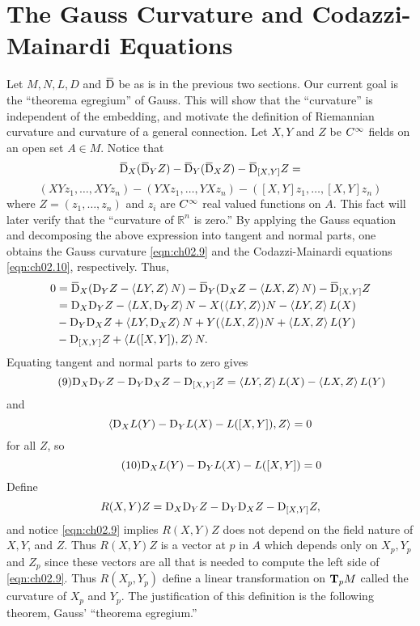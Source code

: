 \documentclass[../main]{subfiles}
\begin{document}
\section{The Gauss Curvature and Codazzi-Mainardi Equations}\label{ch02:s4}
Let $M,N,L,D$ and $\covariant$ be as is in the previous two sections. Our current goal is the ``theorema egregium'' of Gauss. This will show that the ``curvature'' is independent of the embedding, and motivate the definition of Riemannian curvature and curvature of a general connection.
Let $X,Y$ and $Z$ be $\CInfty$ fields on an open set $A \in M$. Notice that
\[\covariant_{X}(\covariant_{Y}Z)-\covariant_{Y}(\covariant_{X}Z)-\covariant_{[X,Y]}Z=\]
\[(XYz_1,\dots,XYz_n)-(YXz_1,\dots,YXz_n)-([X,Y]z_1,\dots,[X,Y]z_n)\]
where $Z=(z_1,\dots,z_n)$ and $z_i$ are $\CInfty$ real valued functions on $A$. This fact will later verify that the ``curvature of $\mathbb{R}^n$ is zero.'' By applying the Gauss equation and decomposing the above expression into tangent and normal parts, one obtains the Gauss curvature \ref{eqn:ch02.9} and the Codazzi-Mainardi equations \ref{eqn:ch02.10}, respectively.
Thus,  
\begin{align*}
0 &=\covariant_{X}(\connection_{Y} Z-\ip{L Y}{Z}N)-\covariant_{Y}(\connection_{X} Z-\ip{LX}{Z}N)-\covariant_{[X, Y]} Z\\
&=\connection_{X} \connection_{Y} Z-\ip{L X}{\connection_{Y} Z}N-X(\ip{LY}{Z}) N-\ip{L Y}{Z}L(X)\\
&-\connection_{Y} \connection_{X} Z+\ip{L Y}{\connection_{X} Z}N+Y(\ip{L X}{Z}) N+\ip{L X}{ Z}L(Y)\\
&-\connection_{[X, Y]} Z+\ip{ L([X, Y])}{ Z}N .
\end{align*}
Equating tangent and normal parts to zero gives
\begin{equation}\tag{9}\label{eqn:ch02.9}
    \connection_{X} \connection_{Y} Z-\connection_{Y} \connection_{X} Z-\connection_{[X, Y]} Z=\ip{LY}{Z}L(X)-\ip{LX}{Z}L(Y)
\end{equation}
and
\[
\ip{\connection_XL(Y)-\connection_YL(X)-L([X,Y])}{Z} = 0
\]
for all $Z$, so
\begin{equation}\tag{10}\label{eqn:ch02.10}
\connection_{X} L(Y)-\connection_{Y} L(X)-L([X, Y])=0
\end{equation}
Define 
\[R(X, Y) Z=\connection_{X} \connection_{Y} Z-\connection_{Y} \connection_{X} Z-\connection_{[X, Y]} Z,\]
and notice \ref{eqn:ch02.9} implies $R(X, Y) Z$ does not depend on the field nature of $X, Y$, and $Z$. Thus $R(X, Y) Z$ is a vector at $p$ in $A$ which depends only on $X_p, Y_{p}$ and $Z_{p}$ since these vectors are all that is needed to compute the left side of \ref{eqn:ch02.9}. Thus $R(X_{p}, Y_{p})$ define a linear transformation on $\tangentspace{M}{p}$ called the curvature of $X_{p}$ and $Y_{p}$. The justification of this definition is the following theorem, Gauss' ``theorema egregium.''
\end{document}
